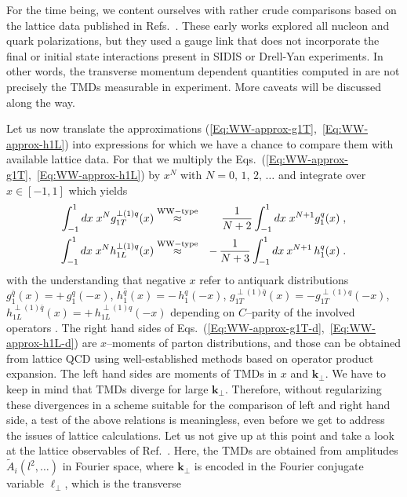 \documentclass[a4paper,11pt]{article}
\newcommand{\ba}{\begin{eqnarray}}
\newcommand{\ea}{\end{eqnarray}}
\newcommand{\orange}[1]{{\color{orange} #1}}
\newcommand{\ak}[1]{\orange{ #1}}
\def\bflperp{{\bm \ell}_\perp}
\def\bfkperp{{\bm k}_\perp}
\begin{document}
For the time being, we content ourselves with rather crude comparisons 
based on the \ak{lattice data}
published in Refs.~\cite{Hagler:2009mb,Musch:2010ka}. 
These early works explored all nucleon and quark polarizations, but 
they used a gauge link that does not incorporate the final or initial 
state interactions present in SIDIS or Drell-Yan experiments. In other 
words, the transverse momentum dependent quantities computed in
\cite{Hagler:2009mb,Musch:2010ka} are not precisely the TMDs measurable 
in experiment. More caveats will be discussed along the way.

Let us now translate the approximations
(\ref{Eq:WW-approx-g1T},~\ref{Eq:WW-approx-h1L}) into expressions
for which we have a chance to compare them with available lattice data.
For that we multiply the
Eqs.~(\ref{Eq:WW-approx-g1T},~\ref{Eq:WW-approx-h1L}) by $x^N$
with $N=0,\,1,\,2,\,\dots$ and integrate over $x\in[-1,1]$ which yields
\ba
        \int_{-1}^1 d x\;x^N
       g_{1T}^{\perp(1)q}(x)&\stackrel{\rm WW-type}{\approx}&
        \phantom{-} \,\frac{1}{N+2} \int_{-1}^1 d x \;x^{N+1}g_1^q(x)
        \;,
    \label{Eq:WW-approx-g1T-d}\\
        \int_{-1}^1 d x\;x^N
        h_{1L}^{\perp(1)q}(x)&\stackrel{\rm WW-type}{\approx}&
        -\,\frac{1}{N+3} \int_{-1}^1 d x\: x^{N+1}\,h_1^q(x)
        \;.
    \label{Eq:WW-approx-h1L-d}
\ea
with the understanding that
negative $x$ refer to antiquark distributions
$g_1^{\bar q}(x) = +\,g_1^{q}(-x)$,
$h_1^{\bar q}(x) = -\,h_1^{q}(-x)$,
$g_{1T}^{\perp(1)\bar q}(x) =- g_{1T}^{\perp(1)q}(-x)$,
$h_{1L}^{\perp(1)\bar q}(x) = +\,h_{1L}^{\perp(1)q}(-x)$
depending on $C$--parity of the involved operators \cite{Mulders:1995dh}.
The right hand sides of 
Eqs.~(\ref{Eq:WW-approx-g1T-d},~\ref{Eq:WW-approx-h1L-d}) are $x$--moments 
of parton distributions, and those can be obtained from lattice QCD using 
well-established methods based on operator product expansion. 
The left hand sides are moments of TMDs in $x$ and $\bfkperp$. We have to 
keep in mind that TMDs diverge for large $\bfkperp$. Therefore, without 
regularizing these divergences in a scheme suitable for the comparison of 
left and right hand side, a test of the above relations is meaningless, 
even before we get to address the issues of lattice calculations. Let us 
not give up at this point and take a look at the lattice observables of 
Ref.~\cite{Musch:2010ka}. Here, the TMDs are obtained from amplitudes 
$\tilde A_i(l^2,\ldots)$ in Fourier space, where $\bfkperp$ is encoded 
in the Fourier conjugate variable $\bflperp$, which is the transverse 
\end{document}
